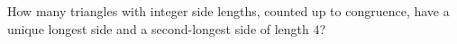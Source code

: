 How many triangles with integer side lengths, counted up to congruence, have a unique longest side and a second-longest side of length $4$?
